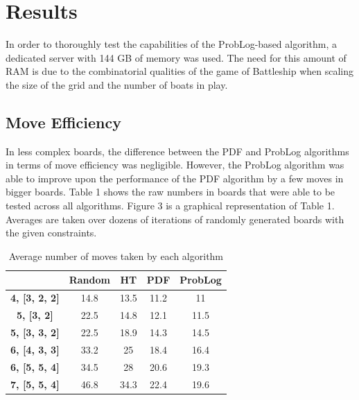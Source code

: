 \documentclass[]{article}
\begin{document}
\section{Results}

In order to thoroughly test the capabilities of the ProbLog-based algorithm, a dedicated server with 144 GB of memory was used. The need for this amount of RAM is due to the combinatorial qualities of the game of Battleship when scaling the size of the grid and the number of boats in play. 

\subsection{Move Efficiency}

In less complex boards, the difference between the PDF and ProbLog algorithms in terms of move efficiency was negligible. However, the ProbLog algorithm was able to improve upon the performance of the PDF algorithm by a few moves in bigger boards. Table 1 shows the raw numbers in boards that were able to be tested across all algorithms. Figure 3 is a graphical representation of Table 1. Averages are taken over dozens of iterations of randomly generated boards with the given constraints.


\begin{table}[]
	\centering
	\begin{tabular}{|c|c|c|c|c|}
		\hline
		& \textbf{Random} & \textbf{HT}   & \textbf{PDF}  & \textbf{ProbLog} \\ \hline
		\textbf{4, {[}3, 2, 2{]}} & 14.8   & 13.5 & 11.2 & 11      \\ \hline
		\textbf{5, {[}3, 2{]}}    & 22.5   & 14.8 & 12.1 & 11.5    \\ \hline
		\textbf{5, {[}3, 3, 2{]}} & 22.5   & 18.9 & 14.3 & 14.5    \\ \hline
		\textbf{6, {[}4, 3, 3{]}} & 33.2   & 25   & 18.4 & 16.4    \\ \hline
		\textbf{6, {[}5, 5, 4{]}} & 34.5   & 28   & 20.6 & 19.3    \\ \hline
		\textbf{7, {[}5, 5, 4{]}} & 46.8   & 34.3 & 22.4 & 19.6    \\ \hline
	\end{tabular}
	\caption{Average number of moves taken by each algorithm}
\end{table}
\end{document}
